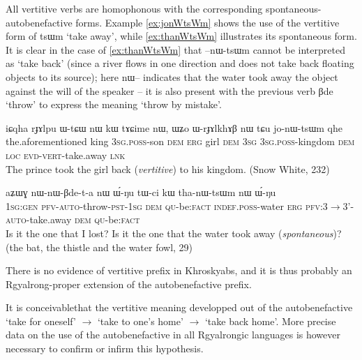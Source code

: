 \documentclass[oldfontcommands,oneside,a4paper,11pt]{article}
\newcommand{\ipa}[1]{{\phon \mbox{#1}}} %
\begin{document}
All vertitive verbs are homophonous with the corresponding spontaneous-autobenefactive forms. Example \ref{ex:jonWtsWm} shows the use of the vertitive form of \ipa{tsɯm} `take away', while \ref{ex:thanWtsWm} illustrates its spontaneous form. It is clear in the case of \ref{ex:thanWtsWm} that \ipa{--nɯ-tsɯm} cannot be interpreted as `take back' (since a river flows in one direction and does not take back floating objects to its source); here \ipa{nɯ--} indicates that the water took away the object against the will of the speaker -- it is also present with the previous verb \ipa{βde} `throw' to express the meaning `throw by mistake'.


\begin{exe}
\ex \label{ex:jonWtsWm}
\gll
\ipa{iɕqha} 	\ipa{rɟɤlpu} 	\ipa{ɯ-tɕɯ} 	\ipa{nɯ} 	\ipa{kɯ} 	\ipa{tɤɕime} 	\ipa{nɯ,} 	\ipa{ɯʑo} 	\ipa{ɯ-rɟɤlkhɤβ} 	\ipa{nɯ} 	\ipa{tɕu} 	\ipa{jo-nɯ-tsɯm} 	\ipa{qhe} \\
the.aforementioned king \textsc{3sg.poss}-son \textsc{dem} \textsc{erg} girl \textsc{dem} \textsc{3sg} \textsc{3sg.poss}-kingdom \textsc{dem} \textsc{loc} \textsc{evd-vert}-take.away \textsc{lnk} \\
\glt The prince took the girl back (\textit{vertitive}) to his kingdom. (Snow White, 232)
\end{exe}



\begin{exe}
\ex \label{ex:thanWtsWm}
\gll
\ipa{aʑɯɣ} 	\ipa{nɯ-nɯ-βde-t-a} 	\ipa{nɯ} 	\ipa{ɯ́-ŋu} 	\ipa{tɯ-ci} 	\ipa{kɯ} 	\ipa{tha-nɯ-tsɯm} 	\ipa{nɯ} 	\ipa{ɯ́-ŋu} \\
\textsc{1sg:gen} \textsc{pfv-auto}-throw-\textsc{pst-1sg} \textsc{dem} \textsc{qu}-be:\textsc{fact} \textsc{indef.poss}-water \textsc{erg} \textsc{pfv}:3$\rightarrow$3'-\textsc{auto}-take.away \textsc{dem} \textsc{qu}-be:\textsc{fact} \\
\glt Is it the one that I lost? Is it the one that the water took away (\textit{spontaneous})? (the bat, the thistle and the water fowl, 29)
\end{exe}


There is no evidence of vertitive prefix in Khroskyabs, and it is thus probably an Rgyalrong-proper extension of the autobenefactive prefix.


It is conceivablethat the vertitive meaning developped out of the autobenefactive `take for oneself' $\rightarrow$ `take to one's home' $\rightarrow$ `take back home'. More precise data on the use of the autobenefactive in all Rgyalrongic languages is however necessary to confirm or infirm this hypothesis.
\end{document}
